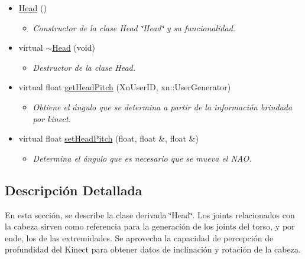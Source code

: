 \begin{itemize}
\item
\hypertarget{class_head_a0a4e931e188a25b60f6b992ff32f7bfa}{\hyperlink{class_head_a0a4e931e188a25b60f6b992ff32f7bfa}{\-Head} ()}\label{class_head_a0a4e931e188a25b60f6b992ff32f7bfa}
\begin{itemize}
\item\small\em \-Constructor de la clase Head \char`\"{}\-Head\char`\"{} y su funcionalidad.\end{itemize}

\item
\hypertarget{class_head_a502987ba6c8d6b615977150dd565fc27}{virtual \hyperlink{class_head_a502987ba6c8d6b615977150dd565fc27}{$\sim$\-Head} (void)}\label{class_head_a502987ba6c8d6b615977150dd565fc27}

\begin{itemize}
\small\item\em \-Destructor de la clase Head. \end{itemize}\item 
virtual float \hyperlink{class_head_ad57a93c84de0a6681dce1dbcdc87823c}{get\-Head\-Pitch} (\-Xn\-User\-I\-D, xn\-::\-User\-Generator)

\begin{itemize}
\small\item\em \-Obtiene el ángulo que se determina a partir de la información brindada por kinect. \end{itemize}\item 
\hypertarget{class_head_a6f624a1b326a840aad5221608809f40f}{virtual float \hyperlink{class_head_a6f624a1b326a840aad5221608809f40f}{set\-Head\-Pitch} (float, float \&, float \&)}\label{class_head_a6f624a1b326a840aad5221608809f40f}

\begin{itemize}\small\item\em \-Determina el ángulo que es necesario que se mueva el \-N\-A\-O. \end{itemize}\end{itemize}


\subsection{\-Descripción \-Detallada}
\-En esta sección, se describe la clase derivada \char`\"{}\-Head\char`\"{}. Los joints relacionados con la cabeza sirven como referencia para la generación de los joints del torso, y por ende, los de las extremidades. Se aprovecha la capacidad de percepción de profundidad del Kinect para obtener datos de inclinación y rotación de la cabeza. 


